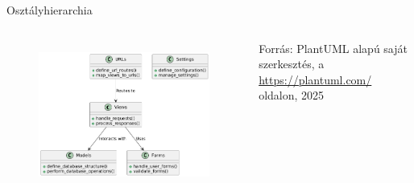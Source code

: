 \documentclass[11pt]{beamer}
\begin{document}
\begin{frame}{Osztályhierarchia}
\begin{columns}[t]
         \begin{figure}[ht!]
            \centering
            \includegraphics[width=\textwidth]{class_hierarchy.png}
            \label{fig-erd}
        \end{figure}
        \vspace{-1.5em}
        \scriptsize
        Forrás: PlantUML alapú saját szerkesztés, a \url{https://plantuml.com/} oldalon, 2025
    \end{columns}
\end{frame}
\end{document}
